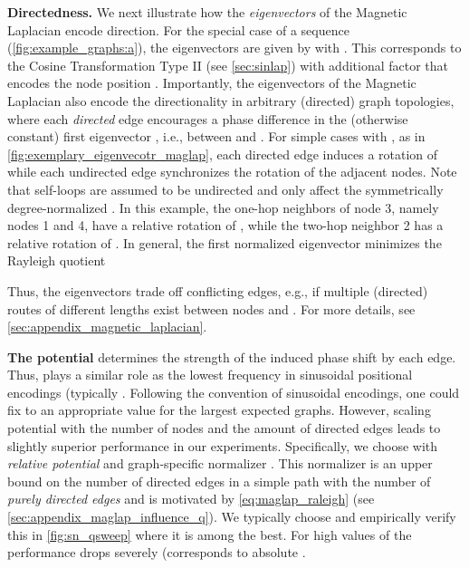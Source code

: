 \documentclass{article}
\begin{document}
\textbf{Directedness.} We next illustrate how the \emph{eigenvectors} of the Magnetic Laplacian  encode direction. For the special case of a sequence (\autoref{fig:example_graphs:a}), the eigenvectors are given by  with . This corresponds to the Cosine Transformation Type II (see \autoref{sec:sinlap}) with additional factor  that encodes the node position . Importantly, the eigenvectors of the Magnetic Laplacian also encode the directionality in arbitrary (directed) graph topologies, where each \emph{directed} edge  encourages a phase difference in the (otherwise constant) first eigenvector , i.e., between  and . 
For simple cases with , as in \autoref{fig:exemplary_eigenvecotr_maglap}, each directed edge induces a rotation of  while each undirected edge synchronizes the rotation of the adjacent nodes. Note that self-loops are assumed to be undirected and only affect the symmetrically degree-normalized . In this example, the one-hop neighbors of node 3, namely nodes 1 and 4, have a relative rotation of , while the two-hop neighbor 2 has a relative rotation of . In general, the first normalized eigenvector  minimizes the Rayleigh quotient

Thus, the eigenvectors trade off conflicting edges, e.g., if multiple (directed) routes of different lengths exist between nodes  and . For more details, see \autoref{sec:appendix_magnetic_laplacian}.

\textbf{The potential } determines the strength of the induced phase shift by each edge. Thus,  plays a similar role as the lowest frequency in sinusoidal positional encodings (typically . Following the convention of sinusoidal encodings, one could fix  to an appropriate value for the largest expected graphs. However, scaling potential  with the number of nodes  and the amount of directed edges leads to slightly superior performance in our experiments. 
Specifically, we choose  with \emph{relative potential}  
and graph-specific normalizer . This normalizer is an upper bound on the number of directed edges in a simple path  with the number of \emph{purely directed edges}  
and is motivated by \autoref{eq:maglap_raleigh} (see \autoref{sec:appendix_maglap_influence_q}). We typically choose  and empirically verify this in \autoref{fig:sn_qsweep} where it is among the best. For high values of  the performance drops severely (corresponds to absolute .
\end{document}
